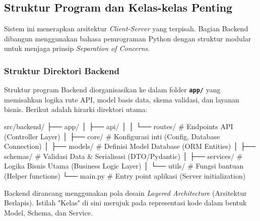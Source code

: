 \documentclass[12pt,a4paper]{article}
\begin{document}
\subsection{Struktur Program dan Kelas-kelas Penting}
Sistem ini menerapkan arsitektur \textit{Client-Server} yang terpisah. Bagian Backend dibangun menggunakan bahasa pemrograman Python dengan struktur modular untuk menjaga prinsip \textit{Separation of Concerns}.

\subsubsection{Struktur Direktori Backend}
Struktur program Backend diorganisasikan ke dalam folder \textbf{\texttt{app/}} yang memisahkan logika rute API, model basis data, skema validasi, dan layanan bisnis. Berikut adalah hirarki direktori utama:

\begin{asciiBox}
src/backend/
├── app/
│   ├── api/
│   │   └── routes/      # Endpoints API (Controller Layer)
│   ├── core/            # Konfigurasi inti (Config, Database Connection)
│   ├── models/          # Definisi Model Database (ORM Entities)
│   ├── schemas/         # Validasi Data & Serialisasi (DTO/Pydantic)
│   ├── services/        # Logika Bisnis Utama (Business Logic Layer)
│   └── utils/           # Fungsi bantuan (Helper functions)
└── main.py              # Entry point aplikasi (Server initialization)
\end{asciiBox}

\noindent Backend dirancang menggunakan pola desain \textit{Layered Architecture} (Arsitektur Berlapis). Istilah "Kelas" di sini merujuk pada representasi kode dalam bentuk Model, Schema, dan Service.
\end{document}
